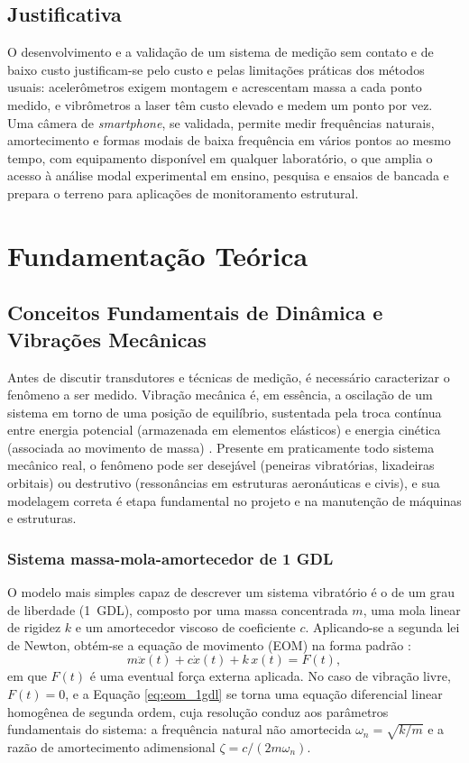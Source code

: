 \documentclass[a4paper,10pt,twocolumn]{article}
\begin{document}
\subsection{Justificativa}
O desenvolvimento e a validação de um sistema de medição sem contato e de baixo custo justificam-se pelo custo e pelas limitações práticas dos métodos usuais: acelerômetros exigem montagem e acrescentam massa a cada ponto medido, e vibrômetros a laser têm custo elevado e medem um ponto por vez. Uma câmera de \textit{smartphone}, se validada, permite medir frequências naturais, amortecimento e formas modais de baixa frequência em vários pontos ao mesmo tempo, com equipamento disponível em qualquer laboratório, o que amplia o acesso à análise modal experimental em ensino, pesquisa e ensaios de bancada e prepara o terreno para aplicações de monitoramento estrutural.

\section{Fundamentação Teórica}

\subsection{Conceitos Fundamentais de Dinâmica e Vibrações Mecânicas}

Antes de discutir transdutores e técnicas de medição, é necessário caracterizar o fenômeno a ser medido. Vibração mecânica é, em essência, a oscilação de um sistema em torno de uma posição de equilíbrio, sustentada pela troca contínua entre energia potencial (armazenada em elementos elásticos) e energia cinética (associada ao movimento de massa) \cite{Downey2026, Rao2010}. Presente em praticamente todo sistema mecânico real, o fenômeno pode ser desejável (peneiras vibratórias, lixadeiras orbitais) ou destrutivo (ressonâncias em estruturas aeronáuticas e civis), e sua modelagem correta é etapa fundamental no projeto e na manutenção de máquinas e estruturas.

\subsubsection{Sistema massa-mola-amortecedor de 1 GDL}

O modelo mais simples capaz de descrever um sistema vibratório é o de um grau de liberdade (1~GDL), composto por uma massa concentrada $m$, uma mola linear de rigidez $k$ e um amortecedor viscoso de coeficiente $c$. Aplicando-se a segunda lei de Newton, obtém-se a equação de movimento (EOM) na forma padrão \cite{Downey2026}:
\begin{equation}
    m\ddot{x}(t) + c\dot{x}(t) + k\,x(t) = F(t),
    \label{eq:eom_1gdl}
\end{equation}
em que $F(t)$ é uma eventual força externa aplicada. No caso de vibração livre, $F(t) = 0$, e a Equação \ref{eq:eom_1gdl} se torna uma equação diferencial linear homogênea de segunda ordem, cuja resolução conduz aos parâmetros fundamentais do sistema: a frequência natural não amortecida $\omega_n = \sqrt{k/m}$ e a razão de amortecimento adimensional $\zeta = c/(2m\omega_n)$.
\end{document}
